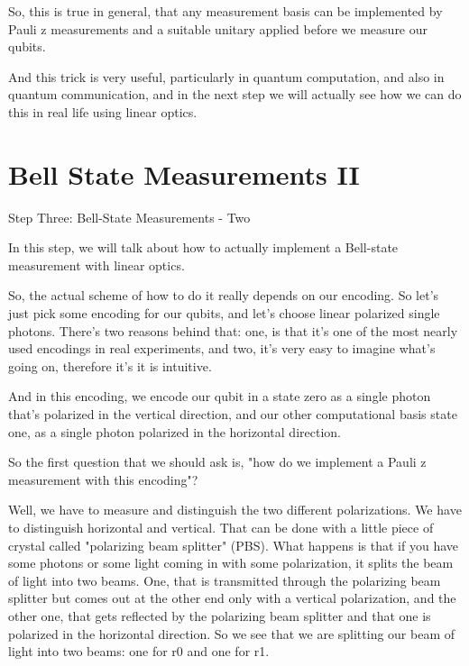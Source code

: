 So, this is true in general, that any measurement basis can be implemented by Pauli z measurements and a suitable unitary applied before we measure our qubits.

And this trick is very useful, particularly in quantum computation, and also in quantum communication, and in the next step we will actually see how we can do this in real life using linear optics.



\section{Bell State Measurements II}

Step Three: Bell-State Measurements - Two

In this step, we will talk about how to actually implement a Bell-state measurement with linear optics.

So, the actual scheme of how to do it really depends on our encoding. So let's just pick some encoding for our qubits, and let's choose linear polarized single photons. There's two reasons behind that: one, is that it's one of the most nearly used encodings in real experiments, and two, it's very easy to imagine what's going on, therefore it's it is intuitive.

And in this encoding, we encode our qubit in a state zero as a single photon that's polarized in the vertical direction, and our other computational basis state one, as a single photon polarized in the horizontal direction.

So the first question that we should ask is, "how do we implement a Pauli z measurement with this encoding"?

Well, we have to measure and distinguish the two different polarizations. We have to distinguish horizontal and vertical. That can be done with a little piece of crystal called "polarizing beam splitter" (PBS). What happens is that if you have some photons or some light coming in with some polarization, it splits the beam of light into two beams. One, that is transmitted through the polarizing beam splitter but comes out at the other end only with a vertical polarization, and the other one, that gets reflected by the polarizing beam splitter and that one is polarized in the horizontal direction. So we see that we are splitting our beam of light into two beams: one for r0 and one for r1.

